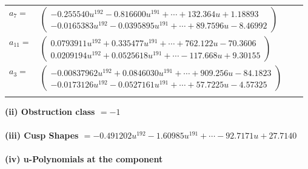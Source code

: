 \documentclass[1p]{elsarticle_modified}
\theoremstyle{definition}
\begin{document}
\begin{tabular}{m{7pt} m{180pt} m{7pt} m{180pt} }
\flushright $a_{7}=$&$\begin{pmatrix}-0.255540 u^{192}-0.816600 u^{191}+\cdots+132.364 u+1.18893\\-0.0165383 u^{192}-0.0395895 u^{191}+\cdots+89.7596 u-8.46992\end{pmatrix}$ \\
\flushright $a_{11}=$&$\begin{pmatrix}0.0793911 u^{192}+0.335477 u^{191}+\cdots+762.122 u-70.3606\\0.0209194 u^{192}+0.0525618 u^{191}+\cdots-117.668 u+9.30155\end{pmatrix}$ \\
\flushright $a_{3}=$&$\begin{pmatrix}-0.00837962 u^{192}+0.0846030 u^{191}+\cdots+909.256 u-84.1823\\-0.0173126 u^{192}-0.0527161 u^{191}+\cdots+57.7225 u-4.57325\end{pmatrix}$\\&\end{tabular}
\flushleft \textbf{(ii) Obstruction class $= -1$}\\~\\
\flushleft \textbf{(iii) Cusp Shapes $= -0.491202 u^{192}-1.60985 u^{191}+\cdots-92.7171 u+27.7140$}\\~\\
\newpage\renewcommand{\arraystretch}{1}
\flushleft \textbf{(iv) u-Polynomials at the component}\newline \\
\end{document}
